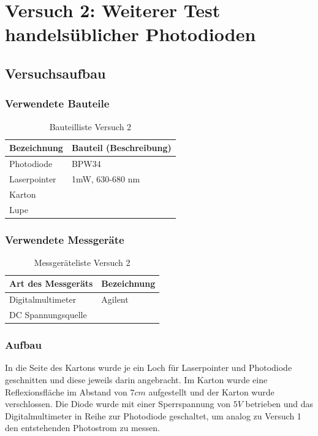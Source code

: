 \section{Versuch 2: Weiterer Test handelsüblicher Photodioden}
\subsection{Versuchsaufbau}
\subsubsection{Verwendete Bauteile}
\begin{table}[H]
	\centering
	\caption{Bauteilliste Versuch 2}
	\begin{tabular}{|l|l|}
		\hline
		\textbf{Bezeichnung} & \textbf{Bauteil (Beschreibung)}
		\\\hline
		Photodiode & BPW34
		\\\hline
		Laserpointer & 1mW, 630-680 nm
		\\\hline
		Karton & 
		\\\hline
		Lupe &
		\\\hline
	\end{tabular}
\end{table}

\subsubsection{Verwendete Messgeräte}
\begin{table}[H]
	\centering
	\caption{Messgeräteliste Versuch 2}
	\begin{tabular}{|l|l|}
		\hline
		\textbf{Art des Messgeräts} & \textbf{Bezeichnung}
		\\\hline
		Digitalmultimeter & Agilent
		\\\hline
		DC Spannungsquelle & 
		\\\hline
	\end{tabular}
\end{table}
\subsubsection{Aufbau}
In die Seite des Kartons wurde je ein Loch für Laserpointer und Photodiode geschnitten und diese jeweils darin angebracht. Im Karton wurde eine Reflexionsfläche im Abstand von $7cm$ aufgestellt und der Karton wurde verschlossen. Die Diode wurde mit einer Sperrspannung von $5V$ betrieben und das Digitalmultimeter in Reihe zur Photodiode geschaltet, um analog zu Versuch 1 den entstehenden Photostrom zu messen. 
